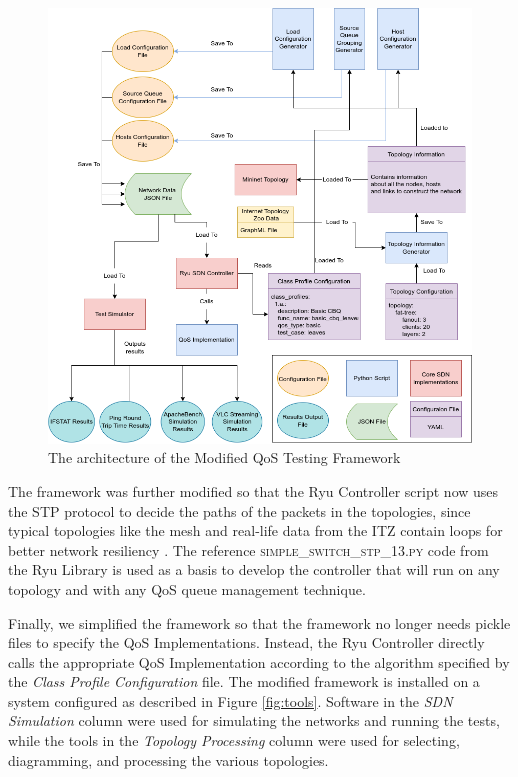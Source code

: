 \begin{figure}[htbp!]
    \centering
    \includegraphics[width=\textwidth]{Figures/Test Framework Architecture.drawio.png}
    \caption{The architecture of the Modified QoS Testing Framework}
    \label{fig:new_architecture}
\end{figure}

The framework was further modified so that the Ryu Controller script now uses the STP protocol to decide the paths of the packets in the topologies, since typical topologies like the mesh and real-life data from the ITZ contain loops for better network resiliency \cite{smith_shortest_2011}. The reference \textsc{simple\_switch\_stp\_13.py} code from the Ryu Library is used as a basis to develop the controller that will run on any topology and with any QoS queue management technique.

Finally, we simplified the framework so that the framework no longer needs pickle files to specify the QoS Implementations. Instead, the Ryu Controller directly calls the appropriate QoS Implementation according to the algorithm specified by the \textit{Class Profile Configuration} file. The modified framework is installed on a system configured as described in Figure \ref{fig:tools}. Software in the \textit{SDN Simulation} column were used for simulating the networks and running the tests, while the tools in the \textit{Topology Processing} column were used for selecting, diagramming, and processing the various topologies.

